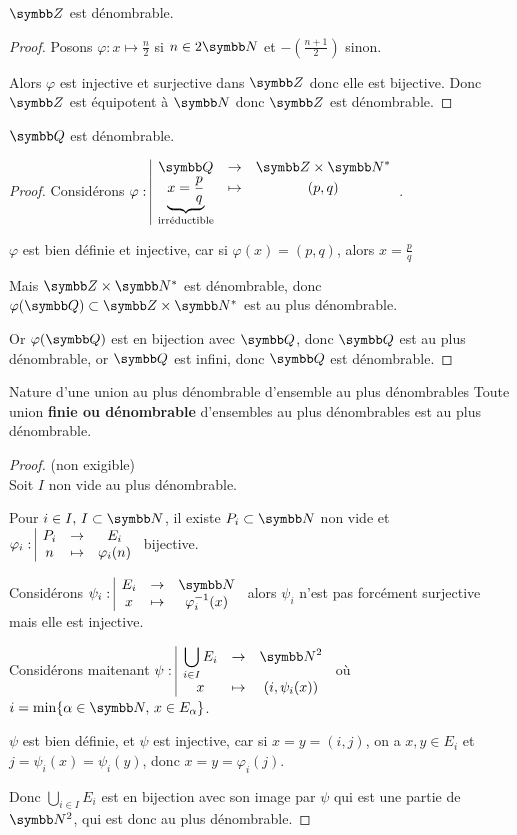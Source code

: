 \begin{theoreme}{}{}
    $\Z$ est dénombrable.
\end{theoreme}

\begin{proof}
Posons $\varphi : x \mapsto \frac n 2$ si $n \in 2 \N$ et $-\left(\frac {n+1} 2\right)$ sinon.

Alors $\varphi$ est injective et surjective dans $\Z$ donc elle est bijective.
Donc $\Z$ est équipotent à $\N$ donc $\Z$ est dénombrable.
\end{proof}

\begin{theoreme}{}{}
    $\Q$ est dénombrable. 
\end{theoreme}


\begin{proof}
    Considérons $\fonction \varphi \Q {\Z \times \N^*}{\underbrace{ x = \frac p q}_{\text{irréductible}} } {(p, q)}$.

    $\varphi$ est bien définie et injective, car si $\varphi(x) = (p, q)$, alors $x = \frac p q$

    Mais $\Z \times \N^*$ est dénombrable, donc $\varphi(\Q) \subset \Z \times \N^*$ est 
    au plus dénombrable. 

    Or $\varphi(\Q)$ est en bijection avec $\Q$, donc $\Q$ est au plus dénombrable, or $\Q$ est 
    infini, donc $\Q$ est dénombrable.
\end{proof}

\begin{theoreme}{Nature d'une union au plus dénombrable d'ensemble au plus dénombrables}{}
    Toute union \textbf{finie ou dénombrable} d'ensembles au plus dénombrables est au plus dénombrable. 
\end{theoreme}

\begin{proof} (non exigible)\\
    Soit $I$ non vide au plus dénombrable.
    
    Pour $i \in I, \, I \subset \N$, il existe $P_i \subset \N$ non vide et $\varphi_i: \space \begin{array}{|ccc} \displaystyle P_i & \to & \displaystyle E_i \\ \displaystyle n & \mapsto & \displaystyle \varphi_i(n)  \end{array}$ bijective. 

    Considérons $\fonction {\psi_i} {E_i} \N x {\varphi_i^{-1}(x)}$ alors $\psi_i$ n'est pas forcément 
    surjective mais elle est injective. 

    Considérons maitenant $\fonction {\psi} {\bigcup_{i \in I} E_i} {\N^2} x {(i, \psi_i(x))}$ où $i = \min \{ \alpha \in \N, \, x \in E_\alpha \}$.

    $\psi$ est bien définie, et $\psi$ est injective, car si $x = y = (i, j)$, 
    on a $x, y \in E_i$ et $j = \psi_i(x) = \psi_i(y)$, donc $x = y = \varphi_i(j)$.

    Donc $\displaystyle \bigcup_{i \in I} E_i$ est en bijection avec son image par $\psi$
    qui est une partie de $\N^2$, qui est donc au plus dénombrable.
\end{proof}

